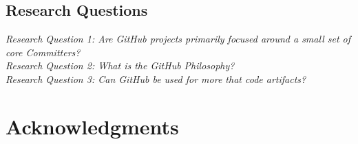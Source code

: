 \documentclass{proc}
\begin{document}
\subsection{Research Questions}
\emph{Research Question 1: Are GitHub projects primarily focused around a small set of core Committers?}\\

\emph{Research Question 2: What is the GitHub Philosophy?}\\

\emph{Research Question 3: Can GitHub be used for more that code artifacts?}\\

\section{Acknowledgments}


  


\end{document}
